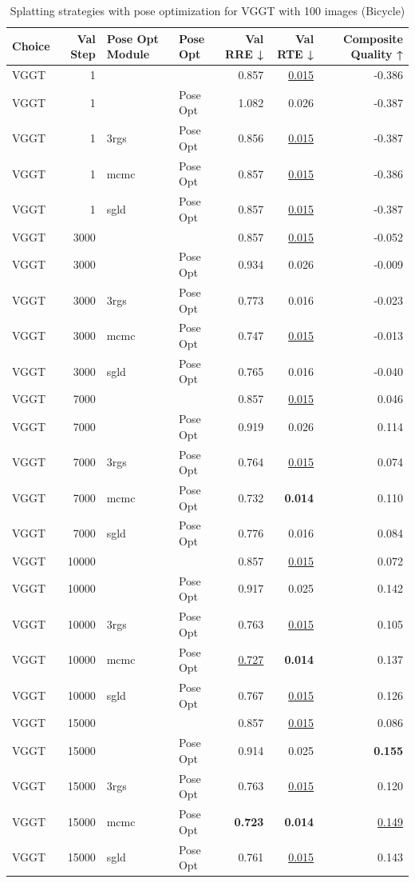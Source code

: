 \begin{table}[H]
\caption{Splatting strategies with pose optimization for VGGT with 100 images (Bicycle)}
\label{tab:99_pose_opt_module_bicycle}
\begin{tabular}{lrllrrr}
\toprule
Choice & Val Step & Pose Opt Module & Pose Opt & Val RRE ↓ & Val RTE ↓ & Composite Quality ↑ \\
\midrule
VGGT & 1 &  &  & 0.857 & \underline{0.015} & -0.386 \\
VGGT & 1 &  & Pose Opt & 1.082 & 0.026 & -0.387 \\
VGGT & 1 & 3rgs & Pose Opt & 0.856 & \underline{0.015} & -0.387 \\
VGGT & 1 & mcmc & Pose Opt & 0.857 & \underline{0.015} & -0.386 \\
VGGT & 1 & sgld & Pose Opt & 0.857 & \underline{0.015} & -0.387 \\
VGGT & 3000 &  &  & 0.857 & \underline{0.015} & -0.052 \\
VGGT & 3000 &  & Pose Opt & 0.934 & 0.026 & -0.009 \\
VGGT & 3000 & 3rgs & Pose Opt & 0.773 & 0.016 & -0.023 \\
VGGT & 3000 & mcmc & Pose Opt & 0.747 & \underline{0.015} & -0.013 \\
VGGT & 3000 & sgld & Pose Opt & 0.765 & 0.016 & -0.040 \\
VGGT & 7000 &  &  & 0.857 & \underline{0.015} & 0.046 \\
VGGT & 7000 &  & Pose Opt & 0.919 & 0.026 & 0.114 \\
VGGT & 7000 & 3rgs & Pose Opt & 0.764 & \underline{0.015} & 0.074 \\
VGGT & 7000 & mcmc & Pose Opt & 0.732 & \textbf{0.014} & 0.110 \\
VGGT & 7000 & sgld & Pose Opt & 0.776 & 0.016 & 0.084 \\
VGGT & 10000 &  &  & 0.857 & \underline{0.015} & 0.072 \\
VGGT & 10000 &  & Pose Opt & 0.917 & 0.025 & 0.142 \\
VGGT & 10000 & 3rgs & Pose Opt & 0.763 & \underline{0.015} & 0.105 \\
VGGT & 10000 & mcmc & Pose Opt & \underline{0.727} & \textbf{0.014} & 0.137 \\
VGGT & 10000 & sgld & Pose Opt & 0.767 & \underline{0.015} & 0.126 \\
VGGT & 15000 &  &  & 0.857 & \underline{0.015} & 0.086 \\
VGGT & 15000 &  & Pose Opt & 0.914 & 0.025 & \textbf{0.155} \\
VGGT & 15000 & 3rgs & Pose Opt & 0.763 & \underline{0.015} & 0.120 \\
VGGT & 15000 & mcmc & Pose Opt & \textbf{0.723} & \textbf{0.014} & \underline{0.149} \\
VGGT & 15000 & sgld & Pose Opt & 0.761 & \underline{0.015} & 0.143 \\
\bottomrule
\end{tabular}
\end{table}
